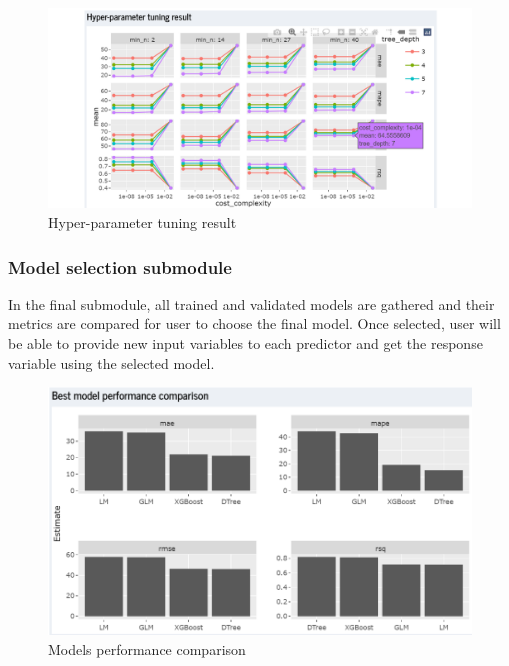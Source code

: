 \documentclass{acm_proc_article-sp}
\begin{document}
\begin{figure}[H]

{\centering \includegraphics[width=1\linewidth]{images/hypartune} 

}

\caption{Hyper-parameter tuning result}\label{fig:unnamed-chunk-15}
\end{figure}

\hypertarget{model-selection-submodule}{%
\subsubsection{Model selection
submodule}\label{model-selection-submodule}}

In the final submodule, all trained and validated models are gathered
and their metrics are compared for user to choose the final model. Once
selected, user will be able to provide new input variables to each
predictor and get the response variable using the selected model.

\begin{figure}[H]

{\centering \includegraphics[width=1\linewidth]{images/mdlcompare} 

}

\caption{Models performance comparison}\label{fig:unnamed-chunk-16}
\end{figure}
\end{document}
